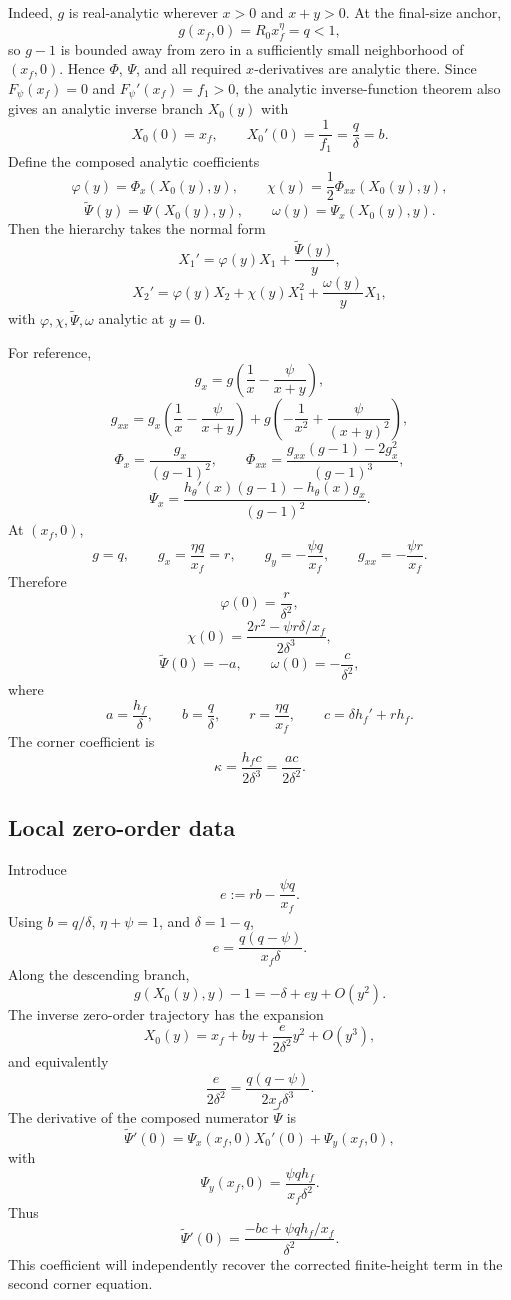 \documentclass[11pt]{article}
\newcommand{\Rzero}{R_0}
\newcommand{\Fpsi}{F_\psi}
\newcommand{\xf}{x_f}
\begin{document}
Indeed, \(g\) is real-analytic wherever \(x>0\) and \(x+y>0\).  At the final-size anchor,
\[
g(\xf,0)=\Rzero\xf^\eta=q<1,
\]
so \(g-1\) is bounded away from zero in a sufficiently small neighborhood of \((\xf,0)\).  Hence \(\Phi\), \(\Psi\), and all required \(x\)-derivatives are analytic there.  Since \(\Fpsi(\xf)=0\) and \(\Fpsi'(\xf)=f_1>0\), the analytic inverse-function theorem also gives an analytic inverse branch \(X_0(y)\) with
\[
X_0(0)=\xf,
\qquad
X_0'(0)=\frac1{f_1}=\frac q\delta=b.
\]
Define the composed analytic coefficients
\[
\varphi(y)=\Phi_x(X_0(y),y),
\qquad
\chi(y)=\frac12\Phi_{xx}(X_0(y),y),
\]
\[
\widetilde\Psi(y)=\Psi(X_0(y),y),
\qquad
\omega(y)=\Psi_x(X_0(y),y).
\]
Then the hierarchy takes the normal form
\[
\boxed{
X_1'=\varphi(y)X_1+\frac{\widetilde\Psi(y)}{y}},
\]
\[
\boxed{
X_2'=\varphi(y)X_2+\chi(y)X_1^2+\frac{\omega(y)}{y}X_1},
\]
with \(\varphi,\chi,\widetilde\Psi,\omega\) analytic at \(y=0\).

For reference,
\[
g_x=g\left(\frac1x-\frac\psi{x+y}\right),
\]
\[
g_{xx}=g_x\left(\frac1x-\frac\psi{x+y}\right)
+g\left(-\frac1{x^2}+\frac\psi{(x+y)^2}\right),
\]
\[
\Phi_x=\frac{g_x}{(g-1)^2},
\qquad
\Phi_{xx}=\frac{g_{xx}(g-1)-2g_x^2}{(g-1)^3},
\]
\[
\Psi_x=\frac{h_\theta'(x)(g-1)-h_\theta(x)g_x}{(g-1)^2}.
\]
At \((\xf,0)\),
\[
g=q,
\qquad
g_x=\frac{\eta q}{\xf}=r,
\qquad
g_y=-\frac{\psi q}{\xf},
\qquad
g_{xx}=-\frac{\psi r}{\xf}.
\]
Therefore
\[
\boxed{\varphi(0)=\frac r{\delta^2}},
\]
\[
\boxed{
\chi(0)=\frac{2r^2-\psi r\delta/\xf}{2\delta^3}},
\]
\[
\boxed{\widetilde\Psi(0)=-a},
\qquad
\boxed{\omega(0)=-\frac c{\delta^2}},
\]
where
\[
a=\frac{h_f}{\delta},
\qquad
b=\frac q\delta,
\qquad
r=\frac{\eta q}{\xf},
\qquad
c=\delta h_f'+rh_f.
\]
The corner coefficient is
\[
\kappa=\frac{h_fc}{2\delta^3}=\frac{ac}{2\delta^2}.
\]

\subsection{Local zero-order data}
Introduce
\[
e:=rb-\frac{\psi q}{\xf}.
\]
Using \(b=q/\delta\), \(\eta+\psi=1\), and \(\delta=1-q\),
\[
\boxed{
e=\frac{q(q-\psi)}{\xf\delta}}.
\]
Along the descending branch,
\[
g(X_0(y),y)-1=-\delta+ey+O(y^2).
\]
The inverse zero-order trajectory has the expansion
\[
\boxed{
X_0(y)=\xf+by+\frac{e}{2\delta^2}y^2+O(y^3)},
\]
and equivalently
\[
\frac{e}{2\delta^2}
=\frac{q(q-\psi)}{2\xf\delta^3}.
\]
The derivative of the composed numerator \(\widetilde\Psi\) is
\[
\widetilde\Psi'(0)
=\Psi_x(\xf,0)X_0'(0)+\Psi_y(\xf,0),
\]
with
\[
\Psi_y(\xf,0)=\frac{\psi qh_f}{\xf\delta^2}.
\]
Thus
\[
\boxed{
\widetilde\Psi'(0)
=\frac{-bc+\psi qh_f/\xf}{\delta^2}}.
\]
This coefficient will independently recover the corrected finite-height term in the second corner equation.
\end{document}
